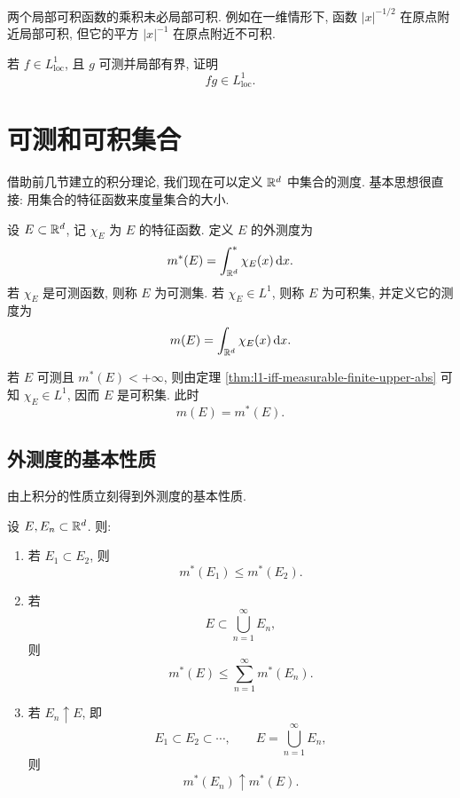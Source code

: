 \begin{rem}
	两个局部可积函数的乘积未必局部可积. 例如在一维情形下, 函数 \(|x|^{-1/2}\) 在原点附近局部可积, 但它的平方 \(|x|^{-1}\) 在原点附近不可积.
\end{rem}

\begin{exer}\label{exer:locally-integrable-times-locally-bounded}
	若 \(f\in L^1_{\operatorname{loc}}\), 且 \(g\) 可测并局部有界, 证明
	\[
	fg\in L^1_{\operatorname{loc}}.
	\]
\end{exer}

\clearpage

\section{可测和可积集合}
\label{sec:measurable-and-integrable-sets}

借助前几节建立的积分理论, 我们现在可以定义 \(\mathbb{R}^d\) 中集合的测度. 基本思想很直接: 用集合的特征函数来度量集合的大小.

\begin{defn}
	\label{def:outer-measure-measurable-integrable-set}
	设 \(E\subset\mathbb{R}^d\), 记 \(\chi_E\) 为 \(E\) 的特征函数. 定义 \(E\) 的外测度为
	\begin{equation}
		m^*(E)=\int_{\mathbb{R}^d}^{*}\chi_E(x)\,\dd x.
		\label{eq:outer-measure-definition}
	\end{equation}
	若 \(\chi_E\) 是可测函数, 则称 \(E\) 为可测集. 若 \(\chi_E\in L^1\), 则称 \(E\) 为可积集, 并定义它的测度为
	\begin{equation}
		m(E)=\int_{\mathbb{R}^d}\chi_E(x)\,\dd x.
		\label{eq:measure-integrable-set-definition}
	\end{equation}
\end{defn}

若 \(E\) 可测且 \(m^*(E)<+\infty\), 则由定理 \ref{thm:l1-iff-measurable-finite-upper-abs} 可知 \(\chi_E\in L^1\), 因而 \(E\) 是可积集. 此时
\[
m(E)=m^*(E).
\]

\subsection{外测度的基本性质}

由上积分的性质立刻得到外测度的基本性质.

\begin{thm}\label{thm:outer-measure-basic-properties}
	设 \(E,E_n\subset\mathbb{R}^d\). 则:
	\begin{enumerate}
		\item 若 \(E_1\subset E_2\), 则
		\[
		m^*(E_1)\leq m^*(E_2).
		\]
		\item 若
		\[
		E\subset \bigcup_{n=1}^{\infty}E_n,
		\]
		则
		\begin{equation}
			m^*(E)\leq \sum_{n=1}^{\infty}m^*(E_n).
			\label{eq:outer-measure-subadditivity}
		\end{equation}
		\item 若 \(E_n\uparrow E\), 即
		\[
		E_1\subset E_2\subset\cdots,
		\qquad
		E=\bigcup_{n=1}^{\infty}E_n,
		\]
		则
		\[
		m^*(E_n)\uparrow m^*(E).
		\]
	\end{enumerate}
\end{thm}

